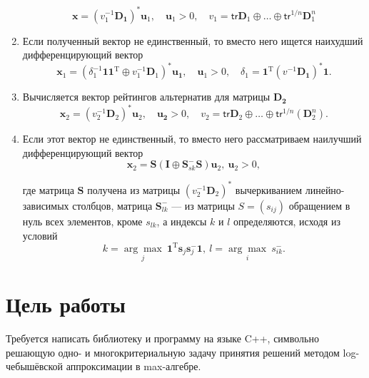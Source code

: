 \documentclass[specialist,
  substylefile = spbu.rtx,
  href,
  colorlinks=true,
  12pt]{disser}
\begin{document}
\begin{enumerate}
	\begin{equation*}
		\boldsymbol{x} = (v^{-1}_1\boldsymbol{D_1})^*\boldsymbol{u}_1,\quad \boldsymbol{u}_1 > 0,\quad v_1 = \mathsf{tr}\boldsymbol{D}_1\oplus\dots\oplus \mathsf{tr}^{1/n}\boldsymbol{D}_1^n
	\end{equation*}
	\item Если полученный вектор не единственный, то вместо него ищется наихудший дифференцирующий вектор
	\begin{equation*}
		\boldsymbol{x}_1 = (\delta^{-1}_1\boldsymbol{11}^\mathrm{T}\oplus v^{-1}_1\boldsymbol{D}_1)^*\boldsymbol{u_1},\quad \boldsymbol{u}_1 > 0,\quad \delta_1 = \boldsymbol{1}^\mathrm{T}(v^{-1}\boldsymbol{D_1})^*\boldsymbol{1}.  
	\end{equation*}
	\item Вычисляется вектор рейтингов альтернатив для матрицы $\boldsymbol{D_2}$
	\begin{equation*}
		\boldsymbol{x}_2 = (v^{-1}_2\boldsymbol{D}_2)^*\boldsymbol{u}_2,\quad \boldsymbol{u_2} > 0,\quad v_2 = \mathsf{tr}\boldsymbol{D}_2\oplus\ldots\oplus\mathsf{tr}^{1/n}(\boldsymbol{D}^n_2).  
	\end{equation*}
	
	\item Если этот вектор не единственный, то вместо него рассматриваем наилучший дифференцирующий вектор
	\begin{equation}
		\boldsymbol{x}_2 =\boldsymbol{S}(\boldsymbol{I}\oplus\boldsymbol{S}^-_{sk}\boldsymbol{S})\boldsymbol{u}_2,~ \boldsymbol{u}_2 > 0,  
	\end{equation}
	
	где матрица $\boldsymbol{S}$ получена из матрицы $(v^{-1}_2\boldsymbol{D}_2)^*$ вычеркиванием линейно-зависимых столбцов, матрица $\boldsymbol{S}^-_{lk}$ --- из матрицы $S = (s_{ij})$ обращением
	в нуль всех элементов, кроме $s_{lk}$, а индексы $k$ и $l$ определяются, исходя из условий
	\begin{equation}
		k = \underset{j}{\arg\max}~\boldsymbol{1}^\mathrm{T}\boldsymbol{s}_j\boldsymbol{s}^-_j\boldsymbol{1},~l = \underset{i}{\arg\max} ~s^-_{ik}.
	\end{equation}
\end{enumerate}


\section{Цель работы}
  Требуется написать библиотеку и программу на языке C++, символьно решающую одно- и многокритериальную задачу принятия решений методом log-чебышёвской аппроксимации в max-алгебре.
\end{document}
